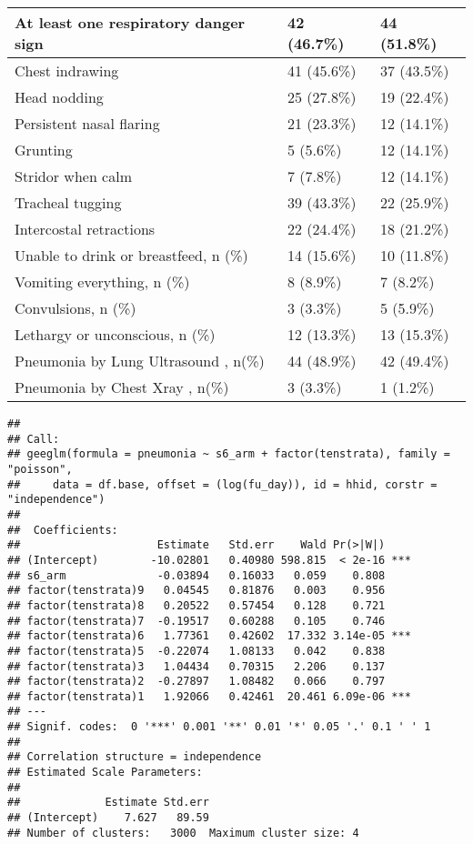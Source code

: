 \documentclass[
]{article}
\begin{document}
\begin{table}[H]
\begin{tabular}[t]{l|l|l}
\hline
At least one respiratory danger sign & 42 (46.7\%) & 44 (51.8\%)\\
\hline
Chest indrawing & 41 (45.6\%) & 37 (43.5\%)\\
\hline
Head nodding & 25 (27.8\%) & 19 (22.4\%)\\
\hline
Persistent nasal flaring & 21 (23.3\%) & 12 (14.1\%)\\
\hline
Grunting & 5  (5.6\%) & 12 (14.1\%)\\
\hline
Stridor when calm & 7  (7.8\%) & 12 (14.1\%)\\
\hline
Tracheal tugging & 39 (43.3\%) & 22 (25.9\%)\\
\hline
Intercostal retractions & 22 (24.4\%) & 18 (21.2\%)\\
\hline
Unable to drink or breastfeed, n (\%) & 14 (15.6\%) & 10 (11.8\%)\\
\hline
Vomiting everything, n (\%) & 8  (8.9\%) & 7  (8.2\%)\\
\hline
Convulsions, n (\%) & 3  (3.3\%) & 5  (5.9\%)\\
\hline
Lethargy or unconscious, n (\%) & 12 (13.3\%) & 13 (15.3\%)\\
\hline
Pneumonia by Lung Ultrasound , n(\%) & 44 (48.9\%) & 42 (49.4\%)\\
\hline
Pneumonia by Chest Xray , n(\%) & 3  (3.3\%) & 1  (1.2\%)\\
\hline
\end{tabular}
\end{table}
\newpage

\begin{verbatim}
## 
## Call:
## geeglm(formula = pneumonia ~ s6_arm + factor(tenstrata), family = "poisson", 
##     data = df.base, offset = (log(fu_day)), id = hhid, corstr = "independence")
## 
##  Coefficients:
##                     Estimate   Std.err    Wald Pr(>|W|)    
## (Intercept)        -10.02801   0.40980 598.815  < 2e-16 ***
## s6_arm              -0.03894   0.16033   0.059    0.808    
## factor(tenstrata)9   0.04545   0.81876   0.003    0.956    
## factor(tenstrata)8   0.20522   0.57454   0.128    0.721    
## factor(tenstrata)7  -0.19517   0.60288   0.105    0.746    
## factor(tenstrata)6   1.77361   0.42602  17.332 3.14e-05 ***
## factor(tenstrata)5  -0.22074   1.08133   0.042    0.838    
## factor(tenstrata)3   1.04434   0.70315   2.206    0.137    
## factor(tenstrata)2  -0.27897   1.08482   0.066    0.797    
## factor(tenstrata)1   1.92066   0.42461  20.461 6.09e-06 ***
## ---
## Signif. codes:  0 '***' 0.001 '**' 0.01 '*' 0.05 '.' 0.1 ' ' 1
## 
## Correlation structure = independence 
## Estimated Scale Parameters:
## 
##             Estimate Std.err
## (Intercept)    7.627   89.59
## Number of clusters:   3000  Maximum cluster size: 4
\end{verbatim}
\end{document}
